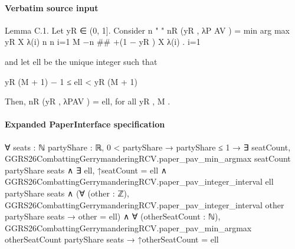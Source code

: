 \documentclass[10pt]{article}
\begin{document}
\paragraph{Verbatim source input}
\begin{ReviewVerbatim}
Lemma C.1. Let yR ∈ (0, 1]. Consider
                                                                          n
                                                       "           "
                              nR (yR , λP AV ) = min arg max yR
                                                                          X
                                                                                λ(i)
                                                  n         n
                                                                          i=1
                                                                   M −n
                                                                                 ##
                                                      +(1 − yR )
                                                                   X
                                                                          λ(i)        .
                                                                   i=1

    and let ell be the unique integer such that

                                    yR (M + 1) − 1 ≤ ell < yR (M + 1)

    Then, nR (yR , λPAV ) = ell, for all yR , M .
\end{ReviewVerbatim}


\paragraph{Expanded PaperInterface specification}
\begin{ReviewVerbatim}
∀ {seats : ℕ} {partyShare : ℝ},
  0 < partyShare →
    partyShare ≤ 1 →
      ∃ seatCount,
        GGRS26CombattingGerrymanderingRCV.paper_pav_min_argmax seatCount partyShare seats ∧
          ∃ ell,
            ↑seatCount = ell ∧
              GGRS26CombattingGerrymanderingRCV.paper_pav_integer_interval ell partyShare seats ∧
                (∀ (other : ℤ),
                    GGRS26CombattingGerrymanderingRCV.paper_pav_integer_interval other partyShare seats → other = ell) ∧
                  ∀ (otherSeatCount : ℕ),
                    GGRS26CombattingGerrymanderingRCV.paper_pav_min_argmax otherSeatCount partyShare seats →
                      ↑otherSeatCount = ell
\end{ReviewVerbatim}
\end{document}
